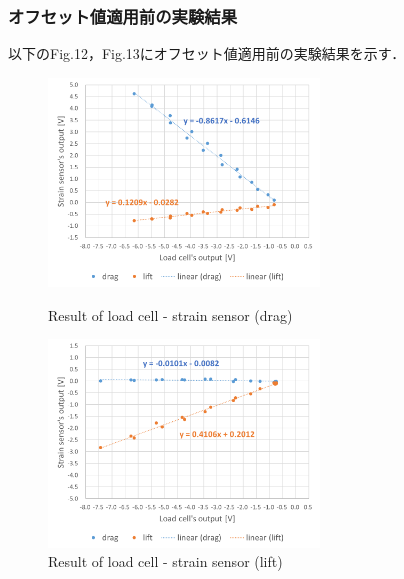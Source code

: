 \documentclass[twocolumn,a4j]{jsarticle}
\begin{document}
\subsubsection*{オフセット値適用前の実験結果}
以下のFig.12，Fig.13にオフセット値適用前の実験結果を示す．
\begin{figure}[htbp]
    \footnotesize
    \begin{center}
        \includegraphics[width=72mm]{../images/calibration_2_drag.png}
        \caption{Result of load cell - strain sensor (drag)}
        \includegraphics[width=72mm]{../images/calibration_2_lift.png}
        \caption{Result of load cell - strain sensor (lift)}
    \end{center}
\end{figure}

\newpage
\end{document}
